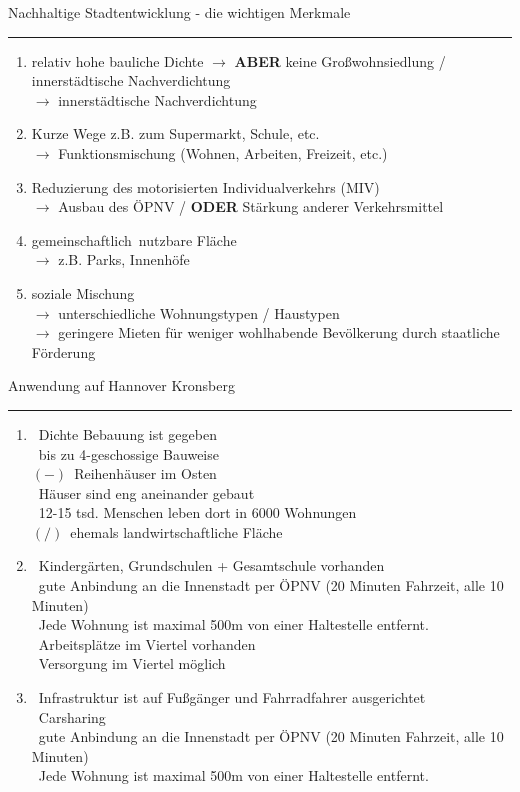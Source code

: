 \documentclass[12pt,a4paper]{report}
\newcommand{\psx}[0]{\color{green!100}{$(+)$}\color{black}\ }
\newcommand{\ngx}[0]{\color{red}$(-)$\color{black}\ }
\newcommand{\ssx}[0]{\color{blue}$(/)$\color{black}\ }
\begin{document}
	\thispagestyle{empty}	
	\noindent
	\Large
	Nachhaltige Stadtentwicklung - die wichtigen Merkmale
	\hrule
	\large
	\vspace{0.25cm}
	\begin{enumerate}
		\item \color{red}relativ hohe bauliche Dichte \color{black} $\to$ \textbf{ABER} keine Großwohnsiedlung / innerstädtische Nachverdichtung \\
		$\to$ innerstädtische Nachverdichtung
		\item \color{red}Kurze Wege z.B. zum Supermarkt, Schule, etc. \color{black} \\
		$\to$ Funktionsmischung (Wohnen, Arbeiten, Freizeit, etc.)
		\item \color{red}Reduzierung des motorisierten Individualverkehrs (MIV)\color{black} \\
		$\to$ Ausbau des \color{red}ÖPNV\color{black} / \textbf{ODER} Stärkung anderer Verkehrsmittel
		\item \color{red}gemeinschaftlich\color{black}\  nutzbare Fläche \\
		$\to$ z.B. Parks, Innenhöfe
		\item \color{red}soziale Mischung\color{black} \\
		$\to$ unterschiedliche Wohnungstypen / Haustypen \\
		$\to$ geringere Mieten für weniger wohlhabende Bevölkerung durch staatliche Förderung
	\end{enumerate}
	\Large
	Anwendung auf Hannover Kronsberg
	\hrule
	\vspace{0.25cm}
	\large
	\begin{enumerate}
		\item \psx Dichte Bebauung ist gegeben \\
		\psx bis zu 4-geschossige Bauweise \\
		\ngx Reihenhäuser im Osten \\
		\psx Häuser sind eng aneinander gebaut \\
		\psx 12-15 tsd. Menschen leben dort in 6000 Wohnungen \\
		\ssx ehemals landwirtschaftliche Fläche
		\item \psx Kindergärten, Grundschulen + Gesamtschule vorhanden \\
		\psx gute Anbindung an die Innenstadt per ÖPNV (20 Minuten Fahrzeit, alle 10 Minuten) \\
		\psx Jede Wohnung ist maximal 500m von einer Haltestelle entfernt. \\
		\psx Arbeitsplätze im Viertel vorhanden \\
		\psx Versorgung im Viertel möglich
		\item \psx Infrastruktur ist auf Fußgänger und Fahrradfahrer ausgerichtet \\
		\psx Carsharing \\
		\psx gute Anbindung an die Innenstadt per ÖPNV (20 Minuten Fahrzeit, alle 10 Minuten) \\
		\psx Jede Wohnung ist maximal 500m von einer Haltestelle entfernt. \\
	\end{enumerate}
\end{document}

